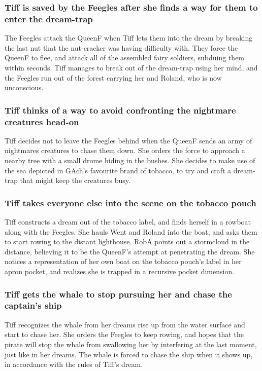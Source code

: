 \subsubsection{\Gls{Tiff} is saved by the Feegles after she finds a way for them to enter the
    dream-trap}
The Feegles attack the \Gls{QueenF} when \Gls{Tiff} lets them into the dream by breaking the last
nut that the nut-cracker was having difficulty with. They force the \Gls{QueenF} to flee, and attack
all of the assembled fairy soldiers, subduing them within seconds. \Gls{Tiff} manages to break out
of the dream-trap using her mind, and the Feegles run out of the forest carrying her and
\Gls{Roland}, who is now unconscious.

\subsubsection{\Gls{Tiff} thinks of a way to avoid confronting the nightmare creatures head-on}
\Gls{Tiff} decides not to leave the Feegles behind when the \Gls{QueenF} sends an army of nightmares
creatures to chase them down. She orders the force to approach a nearby tree with a small drome
hiding in the bushes. She decides to make use of the sea depicted in \Gls{GAch}'s favourite brand of
tobacco, to try and craft a dream-trap that might keep the creatures busy.

\subsubsection{\Gls{Tiff} takes everyone else into the scene on the tobacco pouch}
\Gls{Tiff} constructs a dream out of the tobacco label, and finds herself in a rowboat along with
the Feegles. She hauls \Gls{Went} and \Gls{Roland} into the boat, and asks them to start rowing to
the distant lighthouse. \Gls{RobA} points out a stormcloud in the distance, believing it to be
the \Gls{QueenF}'s attempt at penetrating the dream. She notices a representation of her own boat
on the tobacco pouch's label in her apron pocket, and realizes she is trapped in a recursive pocket
dimension.

\subsubsection{\Gls{Tiff} gets the whale to stop pursuing her and chase the captain's ship}
\Gls{Tiff} recognizes the whale from her dreams rise up from the water surface and start to chase
her. She orders the Feegles to keep rowing, and hopes that the pirate will stop the whale from
swallowing her by interfering at the last moment, just like in her dreams. The whale is forced to
chase the ship when it shows up, in accordance with the rules of \Gls{Tiff}'s dream.

